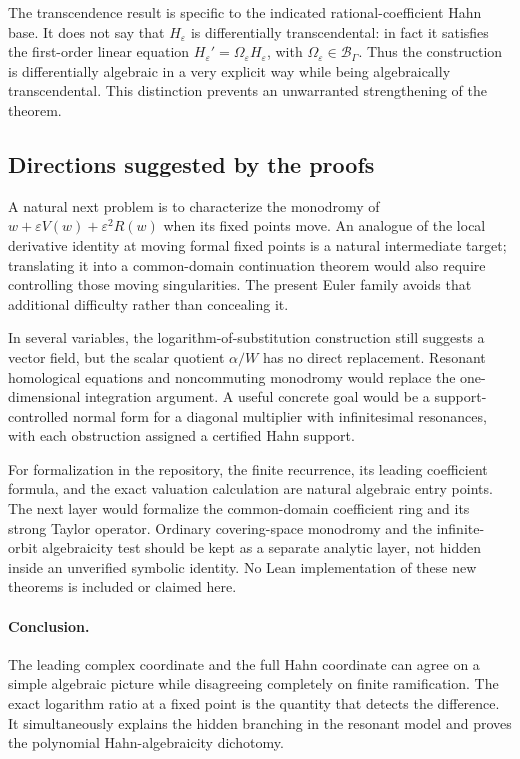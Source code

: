 \documentclass[11pt,a4paper]{article}
\numberwithin{equation}{section}
\theoremstyle{definition}
\theoremstyle{remark}
\newcommand{\B}{\mathscr B_\Gamma}
\newcommand{\eps}{\varepsilon}
\begin{document}
The transcendence result is specific to the indicated rational-coefficient
Hahn base.  It does not say that $H_\eps$ is differentially transcendental:
in fact it satisfies the first-order linear equation
$H_\eps'=\Omega_\eps H_\eps$, with $\Omega_\eps\in\B$.  Thus the construction
is differentially algebraic in a very explicit way while being
algebraically transcendental.  This distinction prevents an unwarranted
strengthening of the theorem.

\subsection{Directions suggested by the proofs}

A natural next problem is to characterize the monodromy of
$w+\eps V(w)+\eps^2R(w)$ when its fixed points move.  An analogue of the local derivative
identity at moving formal fixed points is a natural intermediate target;
translating it into a common-domain continuation theorem would also require
controlling those moving singularities.  The present Euler family
avoids that additional difficulty rather than concealing it.

In several variables, the logarithm-of-substitution construction still
suggests a vector field, but the scalar quotient $\alpha/W$ has no direct
replacement.  Resonant homological equations and noncommuting monodromy
would replace the one-dimensional integration argument.  A useful concrete
goal would be a support-controlled normal form for a diagonal multiplier
with infinitesimal resonances, with each obstruction assigned a certified
Hahn support.

For formalization in the repository, the finite recurrence, its leading
coefficient formula, and the exact valuation calculation are natural
algebraic entry points.  The next layer would formalize the common-domain
coefficient ring and its strong Taylor operator.  Ordinary covering-space
monodromy and the infinite-orbit algebraicity test should be kept as a
separate analytic layer, not hidden inside an unverified symbolic identity.
No Lean implementation of these new theorems is included or claimed here.

\paragraph{Conclusion.}
The leading complex coordinate and the full Hahn coordinate can agree on
a simple algebraic picture while disagreeing completely on finite
ramification.  The exact logarithm ratio at a fixed point is the quantity
that detects the difference.  It simultaneously explains the hidden
branching in the resonant model and proves the polynomial
Hahn-algebraicity dichotomy.
\end{document}
